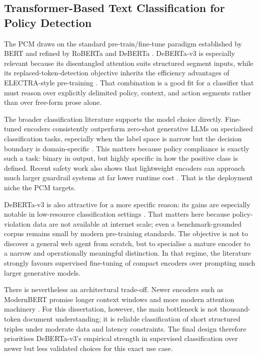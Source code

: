 \documentclass[12pt,a4paper]{article}
\begin{document}
\subsection{Transformer-Based Text Classification for Policy Detection}

The PCM draws on the standard pre-train/fine-tune paradigm established by BERT
and refined by RoBERTa and DeBERTa \citep{devlin2019bert,liu2019roberta,he2021deberta}.
DeBERTa-v3 is especially relevant because its disentangled attention suits
structured segment inputs, while its replaced-token-detection objective inherits
the efficiency advantages of ELECTRA-style pre-training
\citep{he2023debertav3,clark2020electra}. That combination is a good fit for a
classifier that must reason over explicitly delimited policy, context, and
action segments rather than over free-form prose alone.

The broader classification literature supports the model choice directly.
Fine-tuned encoders consistently outperform zero-shot generative LLMs on
specialised classification tasks, especially when the label space is narrow but
the decision boundary is domain-specific
\citep{bucher2024finetuned,galke2025texclassification}. This matters because
policy compliance is exactly such a task: binary in output, but highly specific
in how the positive class is defined. Recent safety work also shows that
lightweight encoders can approach much larger guardrail systems at far lower
runtime cost \citep{zheng2025lightweight}. That is the deployment niche the PCM
targets.

DeBERTa-v3 is also attractive for a more specific reason: its gains are
especially notable in low-resource classification settings
\citep{he2023debertav3}. That matters here because policy-violation data are not
available at internet scale; even a benchmark-grounded corpus remains small by
modern pre-training standards. The objective is not to discover a general web
agent from scratch, but to specialise a mature encoder to a narrow and
operationally meaningful distinction. In that regime, the literature strongly
favours supervised fine-tuning of compact encoders over prompting much larger
generative models.

There is nevertheless an architectural trade-off. Newer encoders such as
ModernBERT promise longer context windows and more modern attention machinery
\citep{warner2024modernbert}. For this dissertation, however, the main
bottleneck is not thousand-token document understanding; it is reliable
classification of short structured triples under moderate data and latency
constraints. The final design therefore prioritises DeBERTa-v3's empirical
strength in supervised classification over newer but less validated choices for
this exact use case.
\end{document}
